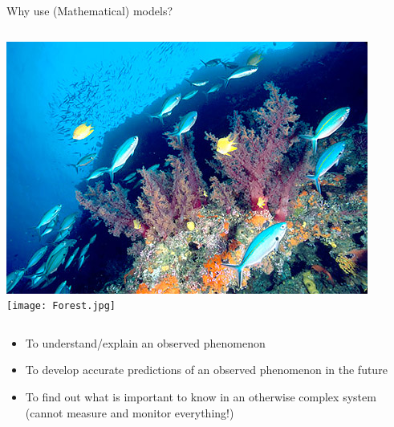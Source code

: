 \documentclass[xcolor=x11names,compress]{beamer}
\renewcommand{\(}{\begin{columns}}
\renewcommand{\)}{\end{columns}}
\newcommand{\<}[1]{\begin{column}{#1}}
\renewcommand{\>}{\end{column}}
\begin{document}
\begin{frame}{Why use (Mathematical) models?}

	\begin{columns}[c]
	  \column{2.3in}
	  \includegraphics[width=\textwidth]{Reef.jpg}
	  \column{2.3in}
	  \texttt{[image: Forest.jpg]}
	\end{columns}
  
	\pause
  
	\begin{itemize}[<+->] \itemsep4pt
	
		\item To understand/explain an observed phenomenon
  
		\item To develop accurate predictions of an observed phenomenon in the future    
		
		\item To find out what is important to know in an otherwise complex system (cannot measure and monitor everything!)
	  
	\end{itemize}
  
  \end{frame}
  
\end{document}
